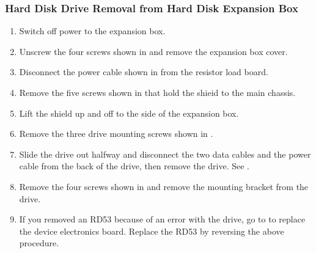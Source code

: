 \subsubsection{Hard Disk Drive Removal from Hard Disk Expansion Box}
\begin{enumerate}
\item	Switch off power to the expansion box.

\item	Unscrew the four screws shown in  and remove the expansion box cover.

\newpage
\item	Disconnect the power cable shown in  from the resistor load board.
\newpage
\item	Remove the five screws shown in  that hold the shieid to the main chassis.
\newpage

\item	Lift the shield up and off to the side of the expansion box.

\item	Remove the three drive mounting screws shown in .
\newpage
\item	Slide the drive out halfway and disconnect the two data cables and the
		power cable from the back of the drive, then remove the drive. See .
\newpage

\item	Remove the four screws shown in  and remove the mounting
		bracket from the drive.

\item	If you removed an RD53 because of an error with the drive, go to 
		to replace the device electronics board. Replace the RD53
		by reversing the above procedure.
\end{enumerate}

\newpage
